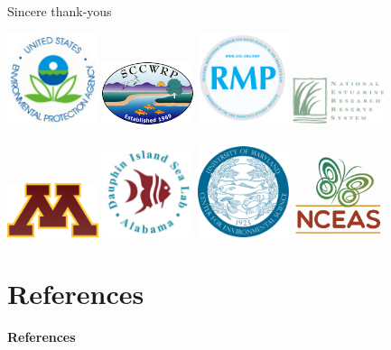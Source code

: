 \documentclass[serif]{beamer}\usepackage[]{graphicx}\usepackage[]{color}
\begin{document}
\begin{frame}{Sincere thank-yous}{}

\includegraphics[width = 0.2\textwidth]{fig/epa.png}
\hfill
\includegraphics[width = 0.2\textwidth]{fig/sccwrp.png}
\hfill
\includegraphics[width = 0.2\textwidth]{fig/sfei.png}
\hfill
\includegraphics[width = 0.2\textwidth]{fig/nerrs.jpg} \\~\\
\includegraphics[width = 0.2\textwidth]{fig/umn.png}
\hfill
\includegraphics[width = 0.2\textwidth]{fig/disl.png}
\hfill
\includegraphics[width = 0.2\textwidth]{fig/umces.png}
\hfill
\includegraphics[width = 0.2\textwidth]{fig/nceas.png}
\end{frame}

\section{References}
\begin{frame}[allowframebreaks,t]{\textbf{References}}
\tiny
{}


\end{frame}
\end{document}
